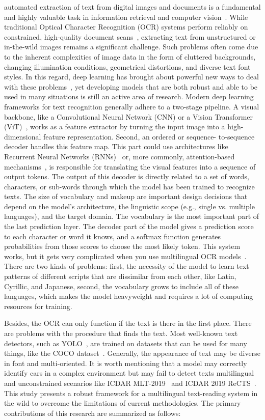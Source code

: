 \documentclass{ieeeaccess}
\begin{document}
 automated extraction of text from digital images and
documents is a fundamental and highly valuable task in information retrieval and computer vision~\cite{b2}. While traditional Optical Character Recognition (OCR) systems perform reliably on constrained, high-quality document scans~\cite{b3}, extracting text from unstructured or in-the-wild images remains a significant challenge. Such problems often come due to the inherent complexities of image data in the form of cluttered backgrounds, changing illumination conditions, geometrical distortions, and diverse text font styles. In this regard, deep learning has brought about powerful new ways to deal with these problems~\cite{b4}, yet developing models that are both robust and able to be used in many situations is still an active area of research. Modern deep learning frameworks for text recognition generally adhere to a two-stage pipeline. A visual backbone, like a Convolutional Neural Network (CNN) or a Vision Transformer (ViT)~\cite{b5}, works as a feature extractor by turning the input image into a high-dimensional feature representation. Second, an ordered or sequence- to-sequence decoder handles this feature map. This part could use architectures like Recurrent Neural Networks (RNNs)~\cite{b6} or, more commonly, attention-based mechanisms~\cite{b7}, is responsible for translating the visual features into a sequence of output tokens. The output of this decoder is directly related to a set of words, characters, or sub-words through which the model has been trained to recognize texts. The size of vocabulary and makeup are important design decisions that depend on the model's architecture, the linguistic scope (e.g., single vs. multiple languages), and the target domain. The vocabulary is the most important part of the last prediction layer. The decoder part of the model gives a prediction score to each character or word it knows, and a softmax function generates probabilities from those scores to choose the most likely token. This system works, but it gets very complicated when you use multilingual OCR models~\cite{b8}. There are two kinds of problems: first, the necessity of the model to learn text patterns of different scripts that are dissimilar from each other, like Latin, Cyrillic, and Japanese, second, the vocabulary grows to include all of these languages, which makes the model heavyweight and requires a lot of computing resources for training. \par
Besides, the OCR can only function if the text is there in the first place. There are problems with the procedure that finds the text. Most well-known text detectors, such as YOLO~\cite{b9}, are trained on datasets that can be used for many things, like the COCO dataset~\cite{b10}. Generally, the appearance of text may be diverse in font and multi-oriented. It is worth mentioning that a model may correctly identify cars in a complex environment but may fail to detect texts multilingual and unconstrained scenarios like ICDAR MLT-2019~\cite{b11} and ICDAR 2019 ReCTS~\cite{b12}.
This study presents a robust framework for a multilingual text-reading system in the wild to overcome the limitations of current methodologies. The primary contributions of this research are summarized as follows:
\end{document}
